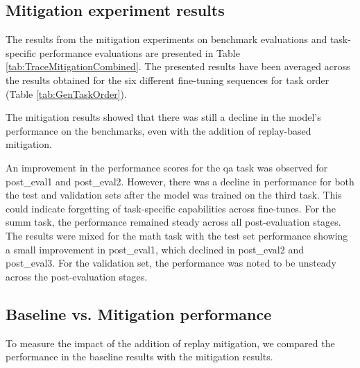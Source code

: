 \subsection{Mitigation experiment results}
The results from the mitigation experiments on benchmark evaluations and task-specific performance evaluations are presented in Table \ref{tab:TraceMitigationCombined}. The presented results have been averaged across the results obtained for the six different fine-tuning sequences for task order (Table \ref{tab:GenTaskOrder}).


The mitigation results showed that there was still a decline in the model's performance on the benchmarks, even with the addition of replay-based mitigation. 

An improvement in the performance scores for the qa task was observed for post\_eval1 and post\_eval2. However, there was a decline in performance for both the test and validation sets after the model was trained on the third task. This could indicate forgetting of task-specific capabilities across fine-tunes. For the summ task, the performance remained steady across all post-evaluation stages. The results were mixed for the math task with the test set performance showing a small improvement in post\_eval1, which declined in post\_eval2 and post\_eval3. For the validation set, the performance was noted to be unsteady across the post-evaluation stages.

\subsection{Baseline vs. Mitigation performance}
To measure the impact of the addition of replay mitigation, we compared the performance in the baseline results with the mitigation results.


